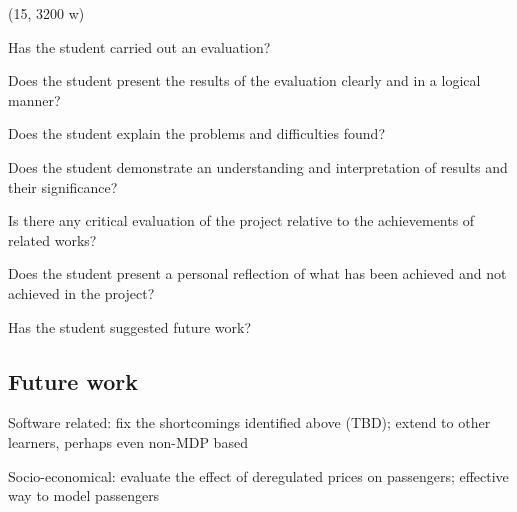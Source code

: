 (15, 3200 w)

Has the student carried out an evaluation?

Does the student present the results of the evaluation clearly and in a logical
manner?

Does the student explain the problems and difficulties found?

Does the student demonstrate an understanding and interpretation of results and
their significance?

Is there any critical evaluation of the project relative to the achievements of
related works?

Does the student present a personal reflection of what has been achieved and
not achieved in the project?

Has the student suggested future work?


\subsection{Future work}

Software related: fix the shortcomings identified above (TBD); extend to other learners, perhaps even non-MDP based

Socio-economical: evaluate the effect of deregulated prices on
passengers; effective way to model passengers
